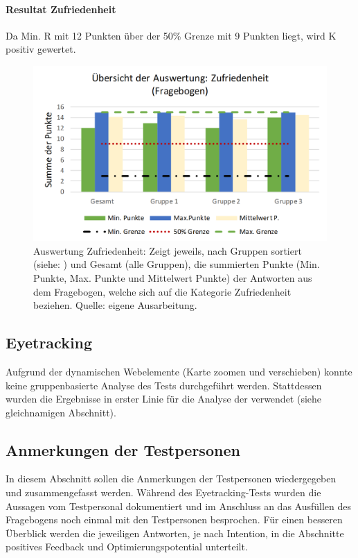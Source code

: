 \documentclass[Bachelorarbeit.tex]{subfiles}
\begin{document}
\paragraph{Resultat Zufriedenheit} Da Min. R mit 12 Punkten über der 50\% Grenze mit 9 Punkten liegt, wird K positiv gewertet.
\begin{figure}[H]
\centering
\includegraphics[width=0.9\linewidth]{img/Evaluation/Usability/AuswertungZufriedenheit}
\caption[Übersicht der Zufriedenheit]{Auswertung Zufriedenheit: Zeigt jeweils, nach Gruppen sortiert (siehe: ) und Gesamt (alle Gruppen), die summierten Punkte (Min. Punkte, Max. Punkte und Mittelwert Punkte) der Antworten aus dem Fragebogen, welche sich auf die Kategorie Zufriedenheit beziehen. Quelle: eigene Ausarbeitung.}
\label{fig:AuswertungZufriedenheit}
\end{figure}

\subsection{Eyetracking}
Aufgrund der dynamischen Webelemente (Karte zoomen und verschieben) konnte keine gruppenbasierte Analyse des Tests durchgeführt werden. 
Stattdessen wurden die Ergebnisse in erster Linie für die Analyse der  verwendet (siehe gleichnamigen Abschnitt). 

\subsection{Anmerkungen der Testpersonen}
\label{AnmerkungUser}
In diesem Abschnitt sollen die Anmerkungen der Testpersonen wiedergegeben und zusammengefasst werden. 
Während des Eyetracking-Tests wurden die Aussagen vom Testpersonal dokumentiert und im Anschluss an das Ausfüllen des Fragebogens noch einmal mit den Testpersonen besprochen.
Für einen besseren Überblick werden die jeweiligen Antworten, je nach Intention, in die Abschnitte positives Feedback und Optimierungspotential unterteilt. 
\end{document}
